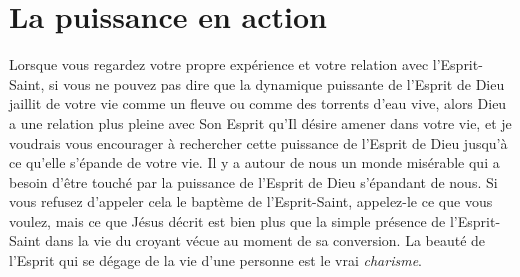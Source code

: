 \section*{La puissance en action}


Lorsque vous regardez votre propre expérience et votre relation
 avec l'Esprit-Saint, si vous ne pouvez pas dire que la dynamique puissante
 de l'Esprit de Dieu jaillit de votre vie comme un fleuve ou comme
 des torrents d'eau vive, alors Dieu a une relation plus pleine
 avec Son Esprit qu'Il désire amener dans votre vie,
 et je voudrais vous encourager à rechercher cette puissance de l'Esprit
 de Dieu jusqu'à ce qu'elle s'épande de votre vie.
 Il y a autour de nous un monde misérable qui a besoin d'être touché
 par la puissance de l'Esprit de Dieu s'épandant de nous.
 Si vous refusez d'appeler cela le baptème de l'Esprit-Saint,
 appelez-le ce que vous voulez, mais ce que Jésus décrit est bien plus
 que la simple présence de l'Esprit-Saint dans la vie du croyant
 vécue au moment de sa conversion. La beauté de l'Esprit qui se dégage de la vie
 d'une personne est le vrai \emph{charisme}.


\closechapter
